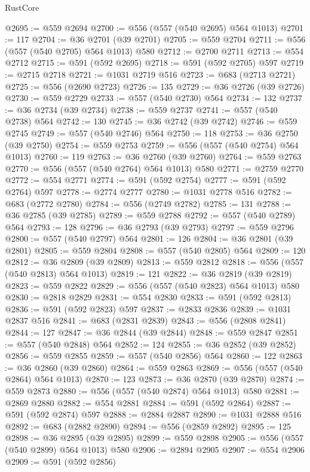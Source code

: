 \begin{lexlean}{RustCore}
\begin{coremodule}
@2695 := @559 @2694
@2700 := @556 (@557 (@540 @2695) @564 @1013)
@2701 := 117
@2704 := @36 @2701 (@39 @2701)
@2705 := @559 @2704
@2711 := @556 (@557 (@540 @2705) @564 @1013) @580
@2712 := @2700 @2711
@2713 := @554 @2712
@2715 := @591 (@592 @2695)
@2718 := @591 (@592 @2705) @597
@2719 := @2715 @2718
@2721 := @1031 @2719 @516
@2723 := @683 (@2713 @2721)
@2725 := @556 (@2690 @2723)
@2726 := 135
@2729 := @36 @2726 (@39 @2726)
@2730 := @559 @2729
@2733 := @557 (@540 @2730) @564
@2734 := 132
@2737 := @36 @2734 (@39 @2734)
@2738 := @559 @2737
@2741 := @557 (@540 @2738) @564
@2742 := 130
@2745 := @36 @2742 (@39 @2742)
@2746 := @559 @2745
@2749 := @557 (@540 @2746) @564
@2750 := 118
@2753 := @36 @2750 (@39 @2750)
@2754 := @559 @2753
@2759 := @556 (@557 (@540 @2754) @564 @1013)
@2760 := 119
@2763 := @36 @2760 (@39 @2760)
@2764 := @559 @2763
@2770 := @556 (@557 (@540 @2764) @564 @1013) @580
@2771 := @2759 @2770
@2772 := @554 @2771
@2774 := @591 (@592 @2754)
@2777 := @591 (@592 @2764) @597
@2778 := @2774 @2777
@2780 := @1031 @2778 @516
@2782 := @683 (@2772 @2780)
@2784 := @556 (@2749 @2782)
@2785 := 131
@2788 := @36 @2785 (@39 @2785)
@2789 := @559 @2788
@2792 := @557 (@540 @2789) @564
@2793 := 128
@2796 := @36 @2793 (@39 @2793)
@2797 := @559 @2796
@2800 := @557 (@540 @2797) @564
@2801 := 126
@2804 := @36 @2801 (@39 @2801)
@2805 := @559 @2804
@2808 := @557 (@540 @2805) @564
@2809 := 120
@2812 := @36 @2809 (@39 @2809)
@2813 := @559 @2812
@2818 := @556 (@557 (@540 @2813) @564 @1013)
@2819 := 121
@2822 := @36 @2819 (@39 @2819)
@2823 := @559 @2822
@2829 := @556 (@557 (@540 @2823) @564 @1013) @580
@2830 := @2818 @2829
@2831 := @554 @2830
@2833 := @591 (@592 @2813)
@2836 := @591 (@592 @2823) @597
@2837 := @2833 @2836
@2839 := @1031 @2837 @516
@2841 := @683 (@2831 @2839)
@2843 := @556 (@2808 @2841)
@2844 := 127
@2847 := @36 @2844 (@39 @2844)
@2848 := @559 @2847
@2851 := @557 (@540 @2848) @564
@2852 := 124
@2855 := @36 @2852 (@39 @2852)
@2856 := @559 @2855
@2859 := @557 (@540 @2856) @564
@2860 := 122
@2863 := @36 @2860 (@39 @2860)
@2864 := @559 @2863
@2869 := @556 (@557 (@540 @2864) @564 @1013)
@2870 := 123
@2873 := @36 @2870 (@39 @2870)
@2874 := @559 @2873
@2880 := @556 (@557 (@540 @2874) @564 @1013) @580
@2881 := @2869 @2880
@2882 := @554 @2881
@2884 := @591 (@592 @2864)
@2887 := @591 (@592 @2874) @597
@2888 := @2884 @2887
@2890 := @1031 @2888 @516
@2892 := @683 (@2882 @2890)
@2894 := @556 (@2859 @2892)
@2895 := 125
@2898 := @36 @2895 (@39 @2895)
@2899 := @559 @2898
@2905 := @556 (@557 (@540 @2899) @564 @1013) @580
@2906 := @2894 @2905
@2907 := @554 @2906
@2909 := @591 (@592 @2856)

\end{coremodule}
\end{lexlean}

